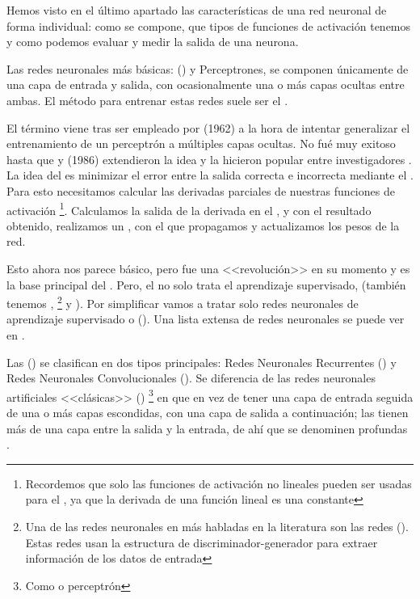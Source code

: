 Hemos visto en el último apartado las características de una red neuronal de forma individual: como se compone, que tipos de funciones de activación tenemos y como podemos evaluar y medir la salida de una neurona.

Las redes neuronales más básicas:  () y Perceptrones, se componen únicamente de una capa de entrada y salida, con ocasionalmente una o más capas ocultas entre ambas. El método para entrenar estas redes suele ser el .

El término  viene tras ser empleado por  (1962)  a la hora de intentar generalizar el entrenamiento de un perceptrón a múltiples capas ocultas. No fué muy exitoso hasta que  y  (1986)  extendieron la idea y la hicieron popular entre investigadores . La idea del  es minimizar el error entre la salida correcta e incorrecta mediante el . Para esto necesitamos calcular las derivadas parciales de nuestras funciones de activación \footnote{Recordemos que solo las funciones de activación no lineales pueden ser usadas para el , ya que la derivada de una función lineal es una constante}. Calculamos la salida de la derivada en el , y con el resultado obtenido, realizamos un , con el que propagamos y actualizamos los pesos de la red.

Esto ahora nos parece básico, pero fue una <<revolución>> en su momento y es la base principal del . Pero, el  no solo trata el aprendizaje supervisado, (también tenemos , \footnote{Una de las redes neuronales en  más habladas en la literatura son las redes  (). Estas redes usan la estructura de discriminador-generador  para extraer información de los datos de entrada} y ). Por simplificar vamos a tratar solo redes neuronales de aprendizaje supervisado o  (). Una lista extensa de redes neuronales se puede ver en .

Las  () se clasifican en dos tipos principales: Redes Neuronales Recurrentes () y Redes Neuronales Convolucionales (). Se diferencia de las redes neuronales artificiales <<clásicas>> () \footnote{Como  o perceptrón} en que en vez de tener una capa de entrada seguida de una o más capas escondidas, con una capa de salida a continuación; las  tienen más de una capa entre la salida y la entrada, de ahí que se denominen profundas .

